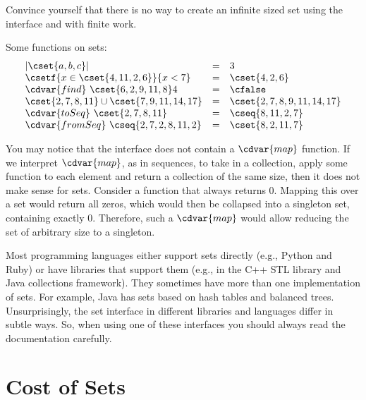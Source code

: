 \begin{exercise}
Convince yourself that there is no way to create an infinite sized set
using the interface and with finite work.
\end{exercise}

\begin{example}
  Some functions on sets:
  \[
\begin{array}{lcl}
|\cset{a,b,c}| & = & 3\\
\csetf{x \in \cset{4,11,2,6}}{x < 7} & = &
\cset{4,2,6}\\
\cdvar{find}~\cset{6,2,9,11,8} 4  & = & \cfalse\\
\cset{2,7,8,11} \cup \cset{7,9,11,14,17} & = &
\cset{2,7,8,9,11,14,17}\\
\cdvar{toSeq}~\cset{2,7,8,11} & = & \cseq{8,11,2,7}\\
\cdvar{fromSeq}~\cseq{2,7,2,8,11,2} & = & \cset{8,2,11,7}
\end{array}
\]
\end{example}

\begin{remark}
You may notice that the interface does not
contain a $\cdvar{map}$ function.  If we interpret $\cdvar{map}$, as in sequences, to take in a collection, apply some
function to each element and return a collection of the same size,
then it does not make sense for sets.
Consider a function that always returns $0$.  Mapping this over a set would
return all zeros, which would then be collapsed into a singleton set, containing
exactly $0$.  Therefore, such a $\cdvar{map}$ would allow reducing the set of
arbitrary size to a singleton.
\end{remark}

\begin{remark}
Most programming languages either support sets directly (e.g., Python and Ruby)
or have libraries that support them (e.g., in the C++ STL library and Java
collections framework).  They sometimes have more than one implementation of
sets.  For example, Java has sets based on hash tables and balanced trees.
Unsurprisingly, the set interface in different libraries and languages differ in
subtle ways.  So, when using one of these interfaces you should always read the
documentation carefully.
\end{remark}


\section{Cost of Sets}

